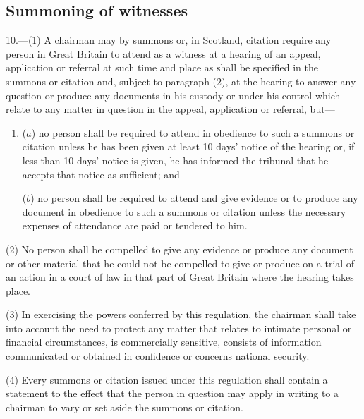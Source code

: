 \documentclass[12pt,a4paper]{article}
\begin{document}
\subsection[10. Summoning of witnesses]{Summoning of witnesses}

10.—(1) A chairman may by summons or, in Scotland, citation require any person in Great Britain to attend as a witness at a hearing of an 
appeal, application or referral  %
at such time and place as shall be specified in the summons or citation and, subject to paragraph (2), at the hearing to answer any question or produce any documents in his custody or under his control which relate to any matter in question in the 
appeal, application or referral,  %
 but---
\begin{enumerate}\item[]
($a$) no person shall be required to attend in obedience to such a summons or citation unless he has been given at least 10 days' notice of the hearing or, if less than 10 days' notice is given, he has informed the tribunal that he accepts that notice as sufficient; and

($b$) no person shall be required to attend and give evidence or to produce any document in obedience to such a summons or citation unless the necessary expenses of attendance are paid or tendered to him.
\end{enumerate}

(2) No person shall be compelled to give any evidence or produce any document or other material that he could not be compelled to give or produce on a trial of an action in a court of law in that part of Great Britain where the hearing takes place.

(3) In exercising the powers conferred by this regulation, the chairman shall take into account the need to protect any matter that relates to intimate personal or financial circumstances, is commercially sensitive, consists of information communicated or obtained in confidence or concerns national security.

(4) Every summons or citation issued under this regulation shall contain a statement to the effect that the person in question may apply in writing to a chairman to vary or set aside the summons or citation.

\end{document}

